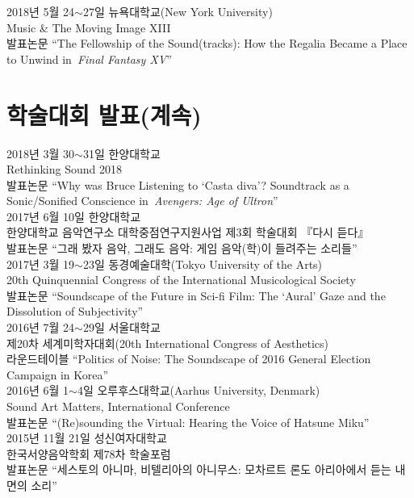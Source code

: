 \documentclass[dvipdfmx,a4paper]{article}
\begin{document}
  \noindent 2018년 5월 24$\sim$27일 뉴욕대학교(New York University)\\
  Music \& The Moving Image XIII\\
  발표논문 “The Fellowship of the Sound(tracks): How the Regalia Became a Place to Unwind in \textit{Final Fantasy XV}”\\
  
  \newpage
  \section*{\normalsize 학술대회 발표(계속)}
  
  \noindent 2018년 3월 30$\sim$31일 한양대학교\\
  Rethinking Sound 2018\\
  발표논문 “Why was Bruce Listening to ‘Casta diva’? Soundtrack as a Sonic/Sonified Conscience in \textit{Avengers: Age of Ultron}”\\
  
  \noindent 2017년 6월 10일 한양대학교\\
  한양대학교 음악연구소 대학중점연구지원사업 제3회 학술대회 『다시 듣다』\\
  발표논문 “그래 봤자 음악, 그래도 음악: 게임 음악(학)이 들려주는 소리들”\\
  
  \noindent 2017년 3월 19$\sim$23일 동경예술대학(Tokyo University of the Arts)\\
  20th Quinquennial Congress of the International Musicological Society\\
  발표논문 “Soundscape of the Future in Sci-fi Film: The ‘Aural’ Gaze and the Dissolution of Subjectivity”\\
  
  \noindent 2016년 7월 24$\sim$29일 서울대학교\\
  제20차 세계미학자대회(20th International Congress of Aesthetics)\\
  라운드테이블 “Politics of Noise: The Soundscape of 2016 General Election Campaign in Korea”\\
  
  \noindent 2016년 6월 1$\sim$4일 오루후스대학교(Aarhus University, Denmark)\\
  Sound Art Matters, International Conference\\
  발표논문 “(Re)sounding the Virtual: Hearing the Voice of Hatsune Miku”\\
  
  \noindent 2015년 11월 21일 성신여자대학교\\
  한국서양음악학회 제78차 학술포럼\\
  발표논문 “세스토의 아니마, 비텔리아의 아니무스: 모차르트 론도 아리아에서 듣는 내면의 소리”\\
  
\end{document}
